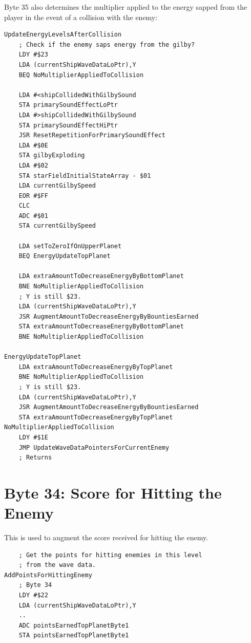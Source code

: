 Byte 35 also determines the multiplier applied to the energy sapped from the player in the 
event of a collision with the enemy:

\begin{lstlisting}
UpdateEnergyLevelsAfterCollision
    ; Check if the enemy saps energy from the gilby?
    LDY #$23
    LDA (currentShipWaveDataLoPtr),Y
    BEQ NoMultiplierAppliedToCollision

    LDA #<shipCollidedWithGilbySound
    STA primarySoundEffectLoPtr
    LDA #>shipCollidedWithGilbySound
    STA primarySoundEffectHiPtr
    JSR ResetRepetitionForPrimarySoundEffect
    LDA #$0E
    STA gilbyExploding
    LDA #$02
    STA starFieldInitialStateArray - $01
    LDA currentGilbySpeed
    EOR #$FF
    CLC
    ADC #$01
    STA currentGilbySpeed

    LDA setToZeroIfOnUpperPlanet
    BEQ EnergyUpdateTopPlanet

    LDA extraAmountToDecreaseEnergyByBottomPlanet
    BNE NoMultiplierAppliedToCollision
    ; Y is still $23.
    LDA (currentShipWaveDataLoPtr),Y
    JSR AugmentAmountToDecreaseEnergyByBountiesEarned
    STA extraAmountToDecreaseEnergyByBottomPlanet
    BNE NoMultiplierAppliedToCollision

EnergyUpdateTopPlanet   
    LDA extraAmountToDecreaseEnergyByTopPlanet
    BNE NoMultiplierAppliedToCollision
    ; Y is still $23.
    LDA (currentShipWaveDataLoPtr),Y
    JSR AugmentAmountToDecreaseEnergyByBountiesEarned
    STA extraAmountToDecreaseEnergyByTopPlanet
NoMultiplierAppliedToCollision
    LDY #$1E
    JMP UpdateWaveDataPointersForCurrentEnemy
    ; Returns

\end{lstlisting}

\section{Byte 34: Score for Hitting the Enemy}
This is used to augment the score received for hitting the enemy.
\begin{lstlisting}
    ; Get the points for hitting enemies in this level
    ; from the wave data.
AddPointsForHittingEnemy   
    ; Byte 34
    LDY #$22
    LDA (currentShipWaveDataLoPtr),Y
    ..
    ADC pointsEarnedTopPlanetByte1
    STA pointsEarnedTopPlanetByte1
\end{lstlisting}


